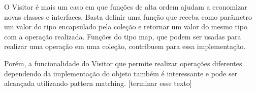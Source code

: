 O Visitor é mais um caso em que funções de alta ordem ajudam a 
economizar novas classes e interfaces. Basta definir uma função 
que receba como parâmetro um valor do tipo encapsulado pela 
coleção e retornar um valor do mesmo tipo com a operação 
realizada. Funções do tipo map, que podem ser usadas para 
realizar uma operação em uma coleção, contribuem para essa 
implementação.

Porém, a funcionalidade do Visitor que permite realizar 
operações diferentes dependendo da implementação do objeto 
também é interessante e pode ser alcançada utilizando 
pattern matching. [terminar esse texto]

\begin{lstlisting}[caption={Visitor Funcional},label=fpvisitor]
    

    
\end{lstlisting}